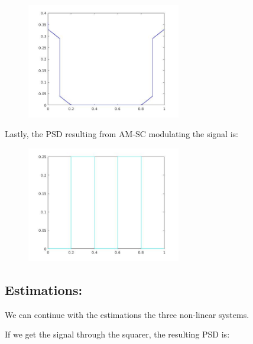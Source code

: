 \documentclass[a4paper,11pt]{article}
\begin{document}
\begin{figure}[!hp]
    \begin{center}
    \includegraphics[width=0.6\textwidth]{images/lab3_8.jpg}
    \end{center}
\end{figure}

Lastly, the PSD resulting from AM-SC modulating the signal is:

\begin{figure}[!hp]
    \begin{center}
    \includegraphics[width=0.6\textwidth]{images/lab3_9.jpg}
    \end{center}
\end{figure}

\newpage

\subsection{Estimations:}

We can continue with the estimations the three non-linear systems.

If we get the signal through the squarer, the resulting PSD is:
\end{document}
